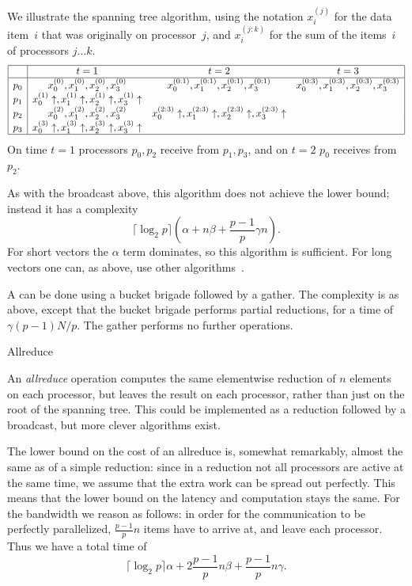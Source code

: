We illustrate the spanning tree algorithm,
using the notation $x_i^{(j)}$ for the data item~$i$
that was originally on processor~$j$, and $x_i^{(j:k)}$ for the sum of
the items~$i$ of processors $j\ldots k$.
\[
\begin{array}{|c|ccc|}
\hline
  &t=1&t=2&t=3\\ \hline
p_0&x_0^{(0)},x_1^{(0)},x_2^{(0)},x_3^{(0)}
   &x_0^{(0:1)},x_1^{(0:1)},x_2^{(0:1)},x_3^{(0:1)}
   &x_0^{(0:3)},x_1^{(0:3)},x_2^{(0:3)},x_3^{(0:3)}\\
p_1&x_0^{(1)}\uparrow,x_1^{(1)}\uparrow,x_2^{(1)}\uparrow,x_3^{(1)}\uparrow
   &&\\
p_2&x_0^{(2)},x_1^{(2)},x_2^{(2)},x_3^{(2)}
   &x_0^{(2:3)}\uparrow,x_1^{(2:3)}\uparrow,x_2^{(2:3)}\uparrow,x_3^{(2:3)}\uparrow
   &\\
p_3&x_0^{(3)}\uparrow,x_1^{(3)}\uparrow,x_2^{(3)}\uparrow,x_3^{(3)}\uparrow
   &&\\
\hline
\end{array}
\]
On time $t=1$ processors $p_0,p_2$ receive from $p_1,p_3$, and on
$t=2$ $p_0$ receives from~$p_2$.

As with the broadcast above, 
this algorithm does not achieve the lower bound; instead it has a complexity
\[ \lceil\log_2 p\rceil (\alpha+n\beta +\frac{p-1}p \gamma n). \]
For short vectors the $\alpha$ term dominates, so this algorithm is sufficient.
For long vectors one can, as above, use other algorithms~\cite{Chan2007Collective}.

A  can be done using a bucket
brigade followed by a gather. The complexity is as above, except that
the bucket brigade performs partial reductions, for a time
of~$\gamma(p-1)N/p$. The gather performs no further operations.


 {Allreduce}

An \emph{allreduce} operation computes the same elementwise reduction of $n$
elements on each processor, but leaves the result on each processor,
rather than just on the root of the spanning tree. This could be
implemented as a reduction followed by a broadcast, but more clever
algorithms exist.

The lower bound on the cost of an allreduce is, somewhat remarkably,
almost the same as of a simple reduction: since in a reduction not all
processors are active at the same time, we assume that the extra work
can be spread out perfectly. This means that the lower bound on the
latency and computation stays the same. For the bandwidth we reason as
follows: in order for the communication to be perfectly parallelized,
$\frac{p-1}p n$ items have to arrive at, and leave each
processor. Thus we have a total time of
\[ \lceil \log_2 p\rceil\alpha +2\frac{p-1}pn\beta
    +\frac{p-1}pn\gamma. \]

